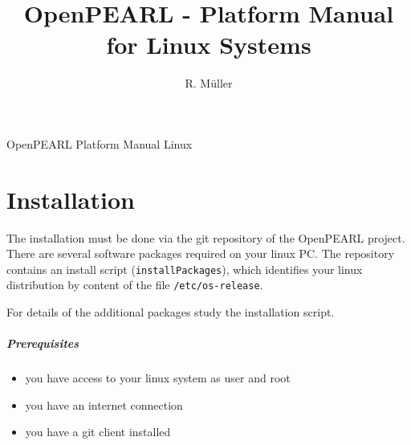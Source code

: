 \documentclass[10pt]{scrbook}
\begin{document}
\title{OpenPEARL - Platform Manual for Linux Systems}
\author{R. M\"uller}

 {
}%
{}%

 {
}%
{}%

\pagestyle{myheadings}
          {OpenPEARL Platform Manual Linux}

\maketitle

\tableofcontents

%
%
%

\chapter{Installation}
The installation must be done via the git repository of the OpenPEARL project.
There are several software packages required on your linux PC. 
The repository contains an install script (\verb|installPackages|),
which identifies your
linux distribution by content of the file \verb|/etc/os-release|.

For details of the additional packages study the installation script.

\paragraph{Prerequisites}
\begin{itemize}
\item you have access to your linux system as user and root
\item you have an internet connection
\item you have a git client installed
\end{itemize}
\end{document}
